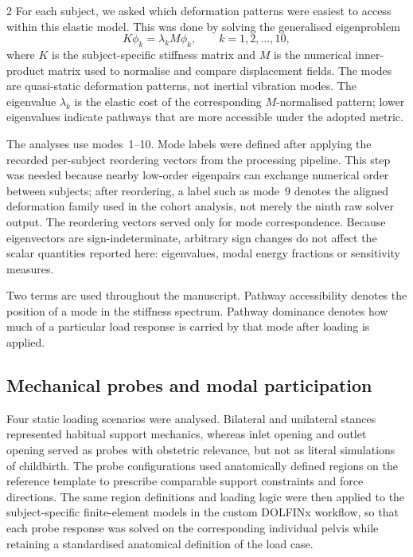 \documentclass[openacc]{rsproca_new}
\begin{document}
\begin{multicols}{2}
For each subject, we asked which deformation patterns were easiest to access within this elastic model. This was done by solving the generalised eigenproblem
\begin{equation}
K\phi_{k} = \lambda_{k} M\phi_{k}, \qquad k=1,2,\ldots,10,
\end{equation}
where $K$ is the subject-specific stiffness matrix and $M$ is the numerical inner-product matrix used to normalise and compare displacement fields. The modes are quasi-static deformation patterns, not inertial vibration modes. The eigenvalue $\lambda_k$ is the elastic cost of the corresponding $M$-normalised pattern; lower eigenvalues indicate pathways that are more accessible under the adopted metric.

The analyses use modes~1--10. Mode labels were defined after applying the recorded per-subject reordering vectors from the processing pipeline. This step was needed because nearby low-order eigenpairs can exchange numerical order between subjects; after reordering, a label such as mode~9 denotes the aligned deformation family used in the cohort analysis, not merely the ninth raw solver output. The reordering vectors served only for mode correspondence. Because eigenvectors are sign-indeterminate, arbitrary sign changes do not affect the scalar quantities reported here: eigenvalues, modal energy fractions or sensitivity measures.

Two terms are used throughout the manuscript. Pathway accessibility denotes the position of a mode in the stiffness spectrum. Pathway dominance denotes how much of a particular load response is carried by that mode after loading is applied.


\subsection{Mechanical probes and modal participation}

Four static loading scenarios were analysed. Bilateral and unilateral stances represented habitual support mechanics, whereas inlet opening and outlet opening served as probes with obstetric relevance, but not as literal simulations of childbirth. The probe configurations used anatomically defined regions on the reference template to prescribe comparable support constraints and force directions. The same region definitions and loading logic were then applied to the subject-specific finite-element models in the custom DOLFINx workflow, so that each probe response was solved on the corresponding individual pelvis while retaining a standardised anatomical definition of the load case.



\end{multicols}
\end{document}
